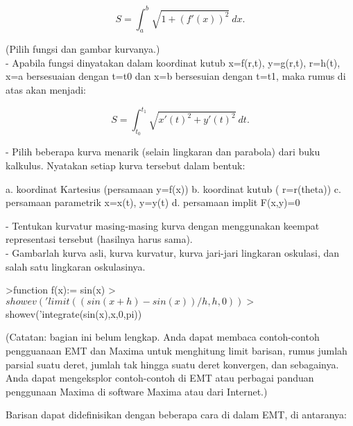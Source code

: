 \documentclass[a4paper,10pt]{article}
\begin{document}
\begin{eulernotebook}
\begin{eulercomment}
\begin{eulercomment}
\begin{eulercomment}
\begin{eulercomment}
\begin{eulercomment}
\begin{eulercomment}
\begin{eulercomment}
\begin{eulercomment}
\begin{eulercomment}
\begin{eulercomment}
\begin{eulercomment}
\begin{eulercomment}
\begin{eulercomment}
\begin{eulercomment}
\begin{eulercomment}
\begin{eulercomment}
\begin{eulercomment}
\end{eulercomment}
\begin{eulerformula}
\[
S = \int_a^b \sqrt{1+(f'(x))^2} \ dx.
\]
\end{eulerformula}
\begin{eulercomment}
(Pilih fungsi dan gambar kurvanya.)\\
- Apabila fungsi dinyatakan dalam koordinat kutub x=f(r,t), y=g(r,t),
r=h(t), x=a bersesuaian dengan t=t0 dan x=b bersesuian dengan t=t1,
maka rumus di atas akan menjadi:

\end{eulercomment}
\begin{eulerformula}
\[
S=\int_{t_0}^{t_1} \sqrt{x'(t)^2+y'(t)^2}\ dt.
\]
\end{eulerformula}
\begin{eulercomment}
- Pilih beberapa kurva menarik (selain lingkaran dan parabola) dari
buku  kalkulus. Nyatakan setiap kurva tersebut dalam bentuk:\\
\end{eulercomment}
\begin{eulerttcomment}
  a. koordinat Kartesius (persamaan y=f(x))
  b. koordinat kutub ( r=r(theta))
  c. persamaan parametrik x=x(t), y=y(t)
  d. persamaan implit F(x,y)=0
\end{eulerttcomment}
\begin{eulercomment}
- Tentukan kurvatur masing-masing kurva dengan menggunakan keempat
representasi tersebut (hasilnya harus sama).\\
- Gambarlah kurva asli, kurva kurvatur, kurva jari-jari lingkaran
oskulasi, dan salah satu lingkaran oskulasinya.
\end{eulercomment}
\begin{eulerprompt}
>function f(x):= sin(x)
>$showev('limit((sin(x+h)-sin(x))/h,h,0))
>$showev(’integrate(sin(x),x,0,pi))
\end{eulerprompt}
\begin{eulercomment}
(Catatan: bagian ini belum lengkap. Anda dapat membaca contoh-contoh pengguanaan EMT dan
Maxima untuk menghitung limit barisan, rumus jumlah parsial suatu deret, jumlah tak hingga
suatu deret konvergen, dan sebagainya. Anda dapat mengeksplor contoh-contoh di EMT atau
perbagai panduan penggunaan Maxima di software Maxima atau dari Internet.)

Barisan dapat didefinisikan dengan beberapa cara di dalam EMT, di antaranya:


\end{eulercomment}
\end{eulercomment}
\end{eulercomment}
\end{eulercomment}
\end{eulercomment}
\end{eulercomment}
\end{eulercomment}
\end{eulercomment}
\end{eulercomment}
\end{eulercomment}
\end{eulercomment}
\end{eulercomment}
\end{eulercomment}
\end{eulercomment}
\end{eulercomment}
\end{eulercomment}
\end{eulercomment}
\end{eulernotebook}
\end{document}
